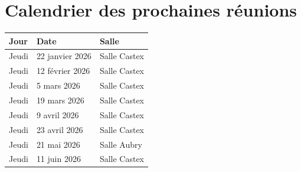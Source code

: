 \documentclass[12pt,a4paper]{article}
\begin{document}
\newpage

\section{Calendrier des prochaines réunions}

\begin{table}[h!]
\centering
\renewcommand{\arraystretch}{1.3}
\begin{tabular}{|l|l|l|}
\hline
\textbf{Jour} & \textbf{Date} & \textbf{Salle} \\
\hline
Jeudi & 22 janvier 2026 & Salle Castex \\
Jeudi & 12 février 2026 & Salle Castex \\
Jeudi & 5 mars 2026 & Salle Castex \\
Jeudi & 19 mars 2026 & Salle Castex \\
Jeudi & 9 avril 2026 & Salle Castex \\
Jeudi & 23 avril 2026 & Salle Castex \\
Jeudi & 21 mai 2026 & Salle Aubry \\
Jeudi & 11 juin 2026 & Salle Castex \\
\hline
\end{tabular}
\end{table}
\end{document}
